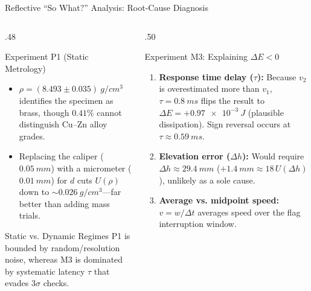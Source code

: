 \documentclass[aspectratio=169,10pt]{beamer}
\newcommand{\sm}{\fontsize{8.2}{10.2}\selectfont}
\newcommand{\xs}{\fontsize{7.1}{9}\selectfont}
\begin{document}
\begin{frame}{Reflective ``So What?'' Analysis: Root-Cause Diagnosis}
\begin{columns}[T,onlytextwidth]
\begin{column}{.48\textwidth}
\begin{block}{Experiment P1 (Static Metrology)}\sm
\begin{itemize}
\item $\rho = (8.493 \pm 0.035)\ \si{g/cm^3}$ identifies the specimen as brass, though $0.41\%$ cannot distinguish Cu--Zn alloy grades.
\item Replacing the caliper ($\SI{0.05}{mm}$) with a micrometer ($\SI{0.01}{mm}$) for $d$ cuts $U(\rho)$ down to $\sim \SI{0.026}{g/cm^3}$—far better than adding mass trials.
\end{itemize}
\end{block}
\begin{exampleblock}{Static vs. Dynamic Regimes}\xs
P1 is bounded by random/resolution noise, whereas M3 is dominated by systematic latency $\tau$ that evades $3\sigma$ checks.
\end{exampleblock}
\end{column}

\begin{column}{.50\textwidth}
\begin{alertblock}{Experiment M3: Explaining $\Delta E < 0$}\sm
\begin{enumerate}
\item \textbf{Response time delay ($\tau$):} Because $v_2$ is overestimated more than $v_1$, $\tau=\SI{0.8}{ms}$ flips the result to $\Delta E = +\SI{0.97e-3}{J}$ (plausible dissipation). Sign reversal occurs at $\tau \approx \SI{0.59}{ms}$.
\item \textbf{Elevation error ($\Delta h$):} Would require $\Delta h \approx \SI{29.4}{mm}$ ($+1.4\ \si{mm} \approx 18\,U(\Delta h)$), unlikely as a sole cause.
\item \textbf{Average vs. midpoint speed:} $v=w/\Delta t$ averages speed over the flag interruption window.
\end{enumerate}
\end{alertblock}
\end{column}
\end{columns}
\end{frame}
\end{document}
